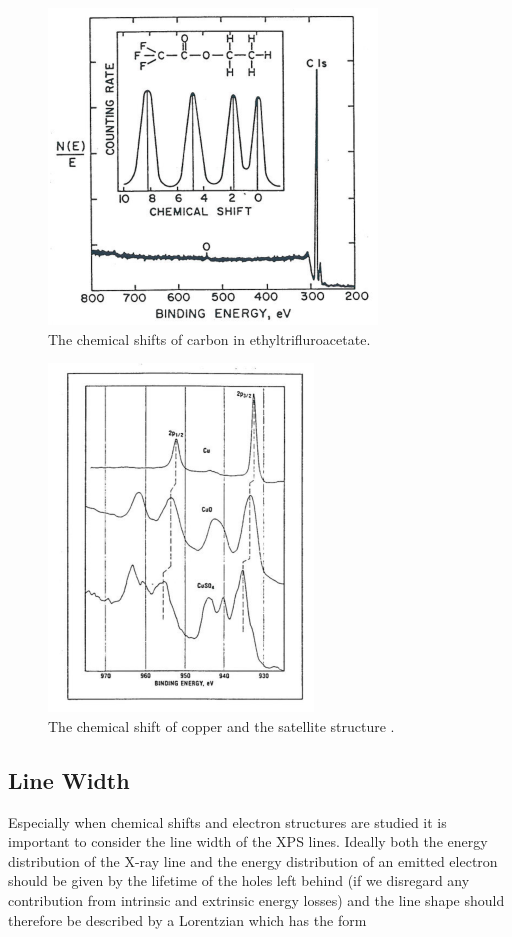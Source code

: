 \begin{figure}[h!]
	\begin{center}
	\includegraphics[scale=4]{figures/04_20.png}
	\caption{The chemical shifts of carbon in ethyltrifluroacetate.}
	\label{fig:cshift}
	\end{center}
\end{figure}

\begin{figure}[h!]
	\begin{center}
	\includegraphics[scale=5]{figures/04_21.png}
	\caption{The chemical shift of copper and the satellite structure \cite{perkin}.}
	\label{fig:cushift}
	\end{center}
\end{figure}

\subsection{Line Width}
Especially when chemical shifts and  electron structures are studied it is important to consider the line width of the XPS lines. Ideally both the energy  distribution of the X-ray line and the  energy distribution of an emitted electron should be given by the lifetime of the holes left behind (if we disregard any contribution from intrinsic and extrinsic energy losses) and the line shape should therefore be described by a Lorentzian which has the form

